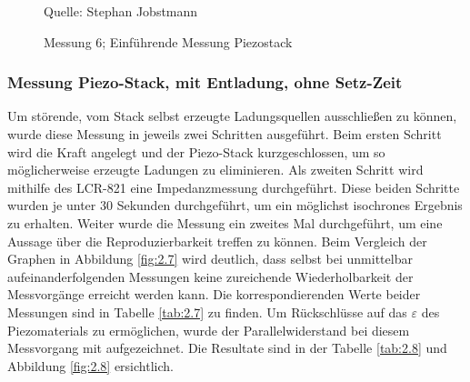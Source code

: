 \documentclass[12pt]{scrreprt} %
\begin{document}
\begin {figure}[htbp]
\caption{Messung 6; Einführende Messung Piezostack}
      \begin{center}
      \end{center}
Quelle: Stephan Jobstmann
\label{fig:2.6}
\end{figure}

\newpage
\subsubsection{Messung Piezo-Stack, mit Entladung, ohne Setz-Zeit}
Um störende, vom Stack selbst erzeugte Ladungsquellen ausschließen zu können, wurde diese Messung in jeweils zwei Schritten ausgeführt. Beim ersten Schritt wird die Kraft angelegt und der Piezo-Stack kurzgeschlossen, um so möglicherweise erzeugte Ladungen zu eliminieren. Als zweiten Schritt wird mithilfe des LCR-821 eine Impedanzmessung durchgeführt. Diese beiden Schritte wurden je unter 30 Sekunden durchgeführt, um ein möglichst isochrones Ergebnis zu erhalten. 
Weiter wurde die Messung ein zweites Mal durchgeführt, um eine Aussage über die Reproduzierbarkeit treffen zu können. Beim Vergleich der Graphen in Abbildung \vref{fig:2.7} wird deutlich, dass selbst bei unmittelbar aufeinanderfolgenden Messungen keine zureichende Wiederholbarkeit der Messvorgänge erreicht werden kann. Die korrespondierenden Werte beider Messungen sind in Tabelle \vref{tab:2.7} zu finden.
Um Rückschlüsse auf das $\varepsilon$ des Piezomaterials zu ermöglichen, wurde der Parallelwiderstand bei diesem Messvorgang mit aufgezeichnet. Die Resultate sind in der Tabelle \vref{tab:2.8} und Abbildung \vref{fig:2.8} ersichtlich.
\end{document}
